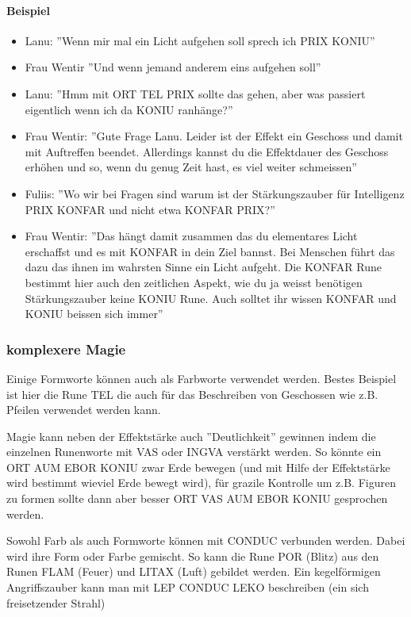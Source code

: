 \documentclass{article}
\begin{document}
\paragraph{Beispiel}

\begin{itemize}
\item Lanu: ''Wenn mir mal ein Licht aufgehen soll sprech ich PRIX KONIU''
\item Frau Wentir ''Und wenn jemand anderem eins aufgehen soll''
\item Lanu: ''Hmm mit ORT TEL PRIX sollte das gehen, aber was passiert eigentlich wenn ich da KONIU ranhänge?''
\item Frau Wentir: ''Gute Frage Lanu. Leider ist der Effekt ein Geschoss und damit mit Auftreffen beendet. Allerdings kannst du die Effektdauer des Geschoss erhöhen und so, wenn du genug Zeit hast, es viel weiter schmeissen''
\item Fuliis: ''Wo wir bei Fragen sind warum ist der Stärkungszauber für Intelligenz PRIX KONFAR und nicht etwa KONFAR PRIX?''
\item Frau Wentir: ''Das hängt damit zusammen das du elementares Licht erschaffst und es mit KONFAR in dein Ziel bannst. Bei Menschen führt das dazu das ihnen im wahrsten Sinne ein Licht aufgeht. Die KONFAR Rune bestimmt hier auch den zeitlichen Aspekt, wie du ja weisst benötigen Stärkungszauber keine KONIU Rune. Auch solltet ihr wissen KONFAR und KONIU beissen sich immer''
\end{itemize}

\subsubsection{komplexere Magie}

Einige Formworte können auch als Farbworte verwendet werden. Bestes Beispiel ist hier die Rune TEL die auch für das
Beschreiben von Geschossen wie z.B. Pfeilen verwendet werden kann.

Magie kann neben der Effektstärke auch ''Deutlichkeit'' gewinnen indem die einzelnen Runenworte mit VAS oder INGVA
verstärkt werden. So könnte ein ORT AUM EBOR KONIU zwar Erde bewegen (und mit Hilfe der Effektstärke wird bestimmt
wieviel Erde bewegt wird), für grazile Kontrolle um z.B. Figuren zu formen sollte dann aber besser 
ORT VAS AUM EBOR KONIU gesprochen werden.

Sowohl Farb als auch Formworte können mit CONDUC verbunden werden. Dabei wird ihre Form oder Farbe gemischt. So kann
die Rune POR (Blitz) aus den Runen FLAM (Feuer) und LITAX (Luft) gebildet werden. Ein kegelförmigen Angriffszauber
kann man mit LEP CONDUC LEKO beschreiben (ein sich freisetzender Strahl)
\end{document}
